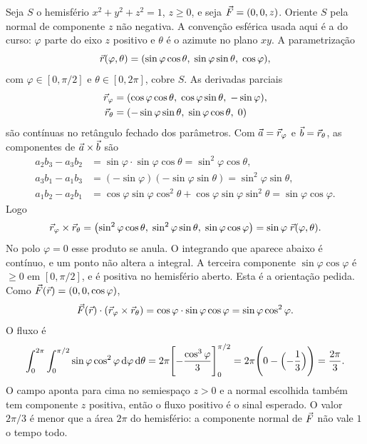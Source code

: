 \documentclass[11pt,a4paper]{article}
\begin{document}
\begin{exemplo}[Hemisfério]
\label{ex:hemisferio}
Seja $S$ o hemisfério $x^2+y^2+z^2=1$, $z\ge 0$, e seja $\vec{F}=(0,0,z)$. Oriente $S$ pela normal de componente $z$ não negativa. A convenção esférica usada aqui é a do curso: $\varphi$ parte do eixo $z$ positivo e $\theta$ é o azimute no plano $xy$. A parametrização
\[
\vec{r}(\varphi,\theta)=(\sin\varphi\cos\theta,\;\sin\varphi\sin\theta,\;\cos\varphi),
\]
com $\varphi\in[0,\pi/2]$ e $\theta\in[0,2\pi]$, cobre $S$. As derivadas parciais
\begin{align*}
\vec{r}_\varphi&=(\cos\varphi\cos\theta,\;\cos\varphi\sin\theta,\;-\sin\varphi),\\
\vec{r}_\theta&=(-\sin\varphi\sin\theta,\;\sin\varphi\cos\theta,\;0)
\end{align*}
são contínuas no retângulo fechado dos parâmetros. Com $\vec{a}=\vec{r}_\varphi$ e $\vec{b}=\vec{r}_\theta$, as componentes de $\vec{a}\times\vec{b}$ são
\begin{align*}
a_2 b_3-a_3 b_2
&=\sin\varphi\cdot\sin\varphi\cos\theta
=\sin^2\varphi\cos\theta,\\
a_3 b_1-a_1 b_3
&=(-\sin\varphi)(-\sin\varphi\sin\theta)
=\sin^2\varphi\sin\theta,\\
a_1 b_2-a_2 b_1
&=\cos\varphi\sin\varphi\cos^2\theta+\cos\varphi\sin\varphi\sin^2\theta
=\sin\varphi\cos\varphi.
\end{align*}
Logo
\[
\vec{r}_\varphi\times\vec{r}_\theta
=\bigl(\sin^2\varphi\cos\theta,\;\sin^2\varphi\sin\theta,\;\sin\varphi\cos\varphi\bigr)
=\sin\varphi\;\vec{r}(\varphi,\theta).
\]
No polo $\varphi=0$ esse produto se anula. O integrando que aparece abaixo é contínuo, e um ponto não altera a integral.
A terceira componente $\sin\varphi\cos\varphi$ é $\ge 0$ em $[0,\pi/2]$, e é positiva no hemisfério aberto. Esta é a orientação pedida. Como $\vec{F}(\vec{r})=(0,0,\cos\varphi)$,
\[
\vec{F}(\vec{r})\cdot(\vec{r}_\varphi\times\vec{r}_\theta)
=\cos\varphi\cdot\sin\varphi\cos\varphi
=\sin\varphi\cos^2\varphi.
\]
O fluxo é
\[
\int_0^{2\pi}\int_0^{\pi/2}\sin\varphi\cos^2\varphi\,\mathrm{d}\varphi\,\mathrm{d}\theta
=2\pi\Biggl[-\frac{\cos^3\varphi}{3}\Biggr]_0^{\pi/2}
=2\pi\Biggl(0-\Bigl(-\frac13\Bigr)\Biggr)
=\frac{2\pi}{3}.
\]
O campo aponta para cima no semiespaço $z>0$ e a normal escolhida também tem componente $z$ positiva, então o fluxo positivo é o sinal esperado. O valor $2\pi/3$ é menor que a área $2\pi$ do hemisfério: a componente normal de $\vec{F}$ não vale $1$ o tempo todo.
\end{exemplo}
\end{document}
